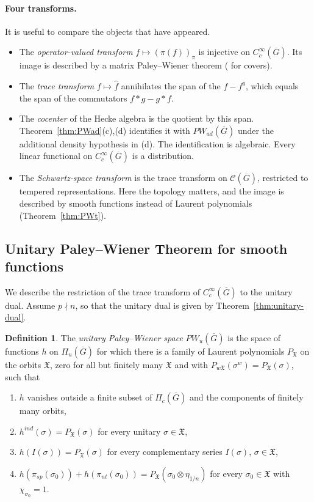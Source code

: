 \documentclass[12pt,letterpaper]{article}
\numberwithin{equation}{section}
\theoremstyle{definition}
\newtheorem{xdefinition}[theorem]{Definition}
\newcommand{\bG}{\overline{G}}
\newcommand{\calC}{\mathcal C}
\newcommand{\fX}{\mathfrak X}
\newcommand{\Piu}{\Pi_{u}(\bG)}
\begin{document}
\paragraph{Four transforms.}  It is useful to compare the objects that have appeared.
\begin{itemize}[leftmargin=*,itemsep=1pt]
\item The \emph{operator-valued transform} $f\mapsto(\pi(f))_\pi$ is injective on
$C_c^\infty(\bG)$.  Its image is described by a matrix Paley--Wiener theorem
(\cite[Appendix~A]{He25} for covers).
\item The \emph{trace transform} $f\mapsto\hat f$ annihilates the span of the
$f-f^y$, which equals the span of the commutators $f*g-g*f$.
\item The \emph{cocenter} of the Hecke algebra is the quotient by this span.
Theorem~\ref{thm:PWad}(c),(d) identifies it with $PW_{ad}(\bG)$ under the
additional density hypothesis in (d). The identification is algebraic.
Every linear functional on $C_c^\infty(\bG)$ is a distribution.
\item The \emph{Schwartz-space transform} is the trace transform on $\calC(\bG)$,
restricted to tempered representations.  Here the topology matters, and the image is
described by smooth functions instead of Laurent polynomials (Theorem~\ref{thm:PWt}).
\end{itemize}

\subsection{Unitary Paley--Wiener Theorem for smooth functions}\label{subsec:PWu}

We describe the restriction of the trace transform of $C_c^\infty(\bG)$ to the unitary
dual.  Assume $p\nmid n$, so that the unitary dual is given by
Theorem~\ref{thm:unitary-dual}.

\begin{xdefinition}\label{def:PWu}
The \emph{unitary Paley--Wiener space} $PW_u(\bG)$ is the space of functions $h$ on $\Piu$
for which there is a family of Laurent polynomials $P_{\fX}$ on the orbits $\fX$, zero for
all but finitely many $\fX$ and with $P_{w\fX}(\sigma^w)=P_{\fX}(\sigma)$, such that
\begin{enumerate}[label=(U\arabic*),leftmargin=*,itemsep=1pt]
\item $h$ vanishes outside a finite subset of $\Pi_c(\bG)$ and the components of finitely
many orbits,
\item $h^{ind}(\sigma)=P_{\fX}(\sigma)$ for every unitary $\sigma\in\fX$,
\item $h(I(\sigma))=P_{\fX}(\sigma)$ for every complementary series $I(\sigma)$, $\sigma\in\fX$,
\item $h(\pi_{sp}(\sigma_0))+h(\pi_{nt}(\sigma_0))=P_{\fX}(\sigma_0\otimes\eta_{1/n})$ for every
$\sigma_0\in\fX$ with $\chi_{\sigma_0}=1$.
\end{enumerate}
\end{xdefinition}
\end{document}
